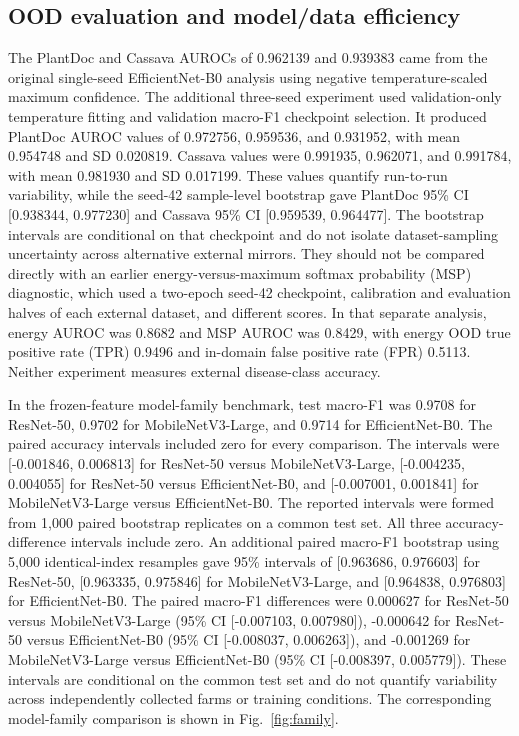 \documentclass{sbc2023}%
\begin{document}
\subsection{OOD evaluation and model/data efficiency}
The PlantDoc and Cassava AUROCs of 0.962139 and 0.939383 came from the original single-seed EfficientNet-B0 analysis using negative temperature-scaled maximum confidence. The additional three-seed experiment used validation-only temperature fitting and validation macro-F1 checkpoint selection. It produced PlantDoc AUROC values of 0.972756, 0.959536, and 0.931952, with mean 0.954748 and SD 0.020819. Cassava values were 0.991935, 0.962071, and 0.991784, with mean 0.981930 and SD 0.017199. These values quantify run-to-run variability, while the seed-42 sample-level bootstrap gave PlantDoc 95\% CI [0.938344, 0.977230] and Cassava 95\% CI [0.959539, 0.964477]. The bootstrap intervals are conditional on that checkpoint and do not isolate dataset-sampling uncertainty across alternative external mirrors. They should not be compared directly with an earlier energy-versus-maximum softmax probability (MSP) diagnostic, which used a two-epoch seed-42 checkpoint, calibration and evaluation halves of each external dataset, and different scores. In that separate analysis, energy AUROC was 0.8682 and MSP AUROC was 0.8429, with energy OOD true positive rate (TPR) 0.9496 and in-domain false positive rate (FPR) 0.5113. Neither experiment measures external disease-class accuracy.

In the frozen-feature model-family benchmark, test macro-F1 was 0.9708 for ResNet-50, 0.9702 for MobileNetV3-Large, and 0.9714 for EfficientNet-B0. The paired accuracy intervals included zero for every comparison. The intervals were [-0.001846, 0.006813] for ResNet-50 versus MobileNetV3-Large, [-0.004235, 0.004055] for ResNet-50 versus EfficientNet-B0, and [-0.007001, 0.001841] for MobileNetV3-Large versus EfficientNet-B0. The reported intervals were formed from 1,000 paired bootstrap replicates on a common test set. All three accuracy-difference intervals include zero. An additional paired macro-F1 bootstrap using 5,000 identical-index resamples gave 95\% intervals of [0.963686, 0.976603] for ResNet-50, [0.963335, 0.975846] for MobileNetV3-Large, and [0.964838, 0.976803] for EfficientNet-B0. The paired macro-F1 differences were 0.000627 for ResNet-50 versus MobileNetV3-Large (95\% CI [-0.007103, 0.007980]), -0.000642 for ResNet-50 versus EfficientNet-B0 (95\% CI [-0.008037, 0.006263]), and -0.001269 for MobileNetV3-Large versus EfficientNet-B0 (95\% CI [-0.008397, 0.005779]). These intervals are conditional on the common test set and do not quantify variability across independently collected farms or training conditions. The corresponding model-family comparison is shown in Fig.~\ref{fig:family}.
\end{document}

